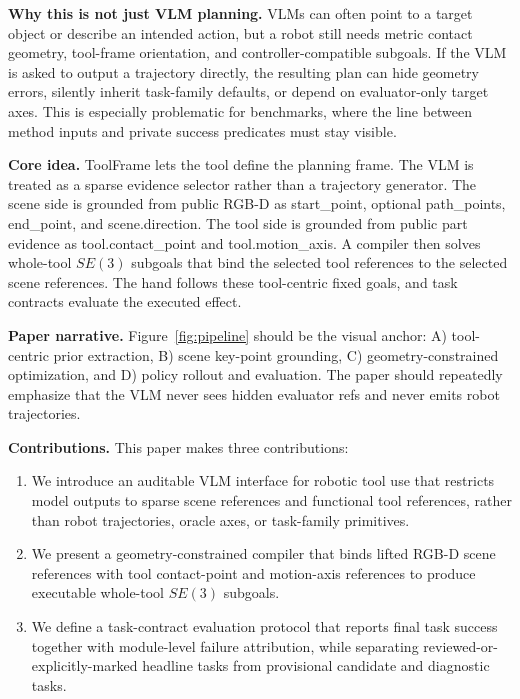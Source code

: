 \documentclass[journal]{IEEEtran}
\newcommand{\method}{ToolFrame}
\begin{document}
\textbf{Why this is not just VLM planning.} VLMs can often point to a target
object or describe an intended action, but a robot still needs metric contact
geometry, tool-frame orientation, and controller-compatible subgoals. If the VLM
is asked to output a trajectory directly, the resulting plan can hide geometry
errors, silently inherit task-family defaults, or depend on evaluator-only
target axes. This is especially problematic for benchmarks, where the line
between method inputs and private success predicates must stay visible.

\textbf{Core idea.} \method{} lets the tool define the planning frame. The VLM
is treated as a sparse evidence selector rather than a trajectory generator.
The scene side is grounded from public RGB-D as start\_point, optional
path\_points, end\_point, and scene.direction. The tool side is grounded from
public part evidence as tool.contact\_point and tool.motion\_axis. A compiler
then solves whole-tool $SE(3)$ subgoals that bind the selected tool references
to the selected scene references. The hand follows these tool-centric fixed
goals, and task contracts evaluate the executed effect.

\textbf{Paper narrative.} Figure~\ref{fig:pipeline} should be the visual anchor:
A) tool-centric prior extraction, B) scene key-point grounding, C)
geometry-constrained optimization, and D) policy rollout and evaluation. The
paper should repeatedly emphasize that the VLM never sees hidden evaluator refs
and never emits robot trajectories.

\textbf{Contributions.} This paper makes three contributions:
\begin{enumerate}
  \item We introduce an auditable VLM interface for robotic tool use that
  restricts model outputs to sparse scene references and functional tool
  references, rather than robot trajectories, oracle axes, or task-family
  primitives.
  \item We present a geometry-constrained compiler that binds lifted RGB-D
  scene references with tool contact-point and motion-axis references to
  produce executable whole-tool $SE(3)$ subgoals.
  \item We define a task-contract evaluation protocol that reports final task
  success together with module-level failure attribution, while separating
  reviewed-or-explicitly-marked headline tasks from provisional candidate and
  diagnostic tasks.
\end{enumerate}
\end{document}
